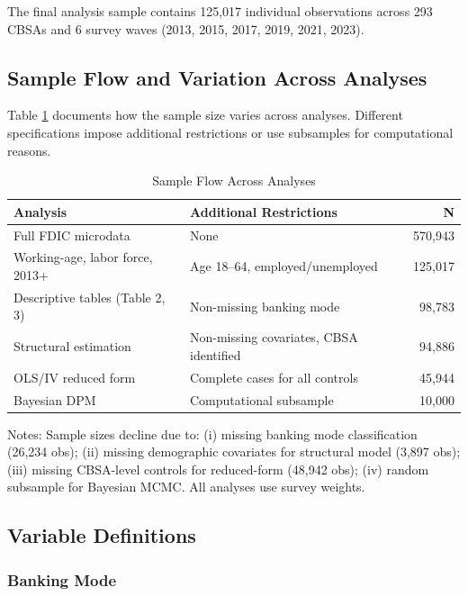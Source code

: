 \documentclass[12pt]{article}
\begin{document}
The final analysis sample contains 125,017 individual observations across 293 CBSAs and 6 survey waves (2013, 2015, 2017, 2019, 2021, 2023).

\subsection{Sample Flow and Variation Across Analyses}

Table \ref{tab:sample_flow} documents how the sample size varies across analyses. Different specifications impose additional restrictions or use subsamples for computational reasons.

\begin{table}[H]
\centering
\caption{Sample Flow Across Analyses}
\label{tab:sample_flow}
\begin{threeparttable}
\begin{tabular}{llr}
\toprule
Analysis & Additional Restrictions & N \\
\midrule
Full FDIC microdata & None & 570,943 \\
Working-age, labor force, 2013+ & Age 18--64, employed/unemployed & 125,017 \\
Descriptive tables (Table 2, 3) & Non-missing banking mode & 98,783 \\
Structural estimation & Non-missing covariates, CBSA identified & 94,886 \\
OLS/IV reduced form & Complete cases for all controls & 45,944 \\
Bayesian DPM & Computational subsample & 10,000 \\
\bottomrule
\end{tabular}
\begin{tablenotes}
\small
\item Notes: Sample sizes decline due to: (i) missing banking mode classification (26,234 obs); (ii) missing demographic covariates for structural model (3,897 obs); (iii) missing CBSA-level controls for reduced-form (48,942 obs); (iv) random subsample for Bayesian MCMC. All analyses use survey weights.
\end{tablenotes}
\end{threeparttable}
\end{table}

\subsection{Variable Definitions}

\subsubsection{Banking Mode}
\end{document}
